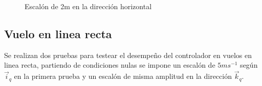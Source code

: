 \documentclass[main]{subfiles}
\begin{document}
\begin{figure}[h!]
  \centering
 
  \caption{Escal\'on de 2m en la direcci\'on horizontal}
  \label{fig:hov_esc_x}
\end{figure}

\subsection{Vuelo en linea recta}
Se realizan dos pruebas para testear el desempeño del controlador en vuelos en linea recta, partiendo de condiciones nulas se impone un escal\'on de $5m s ^{-1}$ seg\'un $\vec{i}_q$ en la primera prueba y un escal\'on de misma amplitud en la direcci\'on $\vec{k}_q$.
\end{document}
